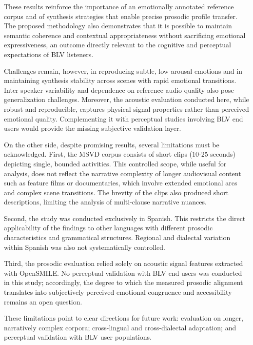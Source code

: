 \documentclass[pdflatex,iicol,sn-mathphys-num]{sn-jnl}%
\theoremstyle{thmstyleone}%
\theoremstyle{thmstyletwo}%
\theoremstyle{thmstylethree}%
\begin{document}
These results reinforce the importance of an emotionally annotated reference corpus and of synthesis strategies that enable precise prosodic profile transfer. The proposed methodology also demonstrates that it is possible to maintain semantic coherence and contextual appropriateness without sacrificing emotional expressiveness, an outcome directly relevant to the cognitive and perceptual expectations of BLV listeners.

Challenges remain, however, in reproducing subtle, low-arousal emotions and in maintaining synthesis stability across scenes with rapid emotional transitions. Inter-speaker variability and dependence on reference-audio quality also pose generalization challenges. Moreover, the acoustic evaluation conducted here, while robust and reproducible, captures physical signal properties rather than perceived emotional quality. Complementing it with perceptual studies involving BLV end users would provide the missing subjective validation layer.

On the other side, despite promising results, several limitations must be acknowledged. First, the MSVD corpus consists of short clips (10-25 seconds) depicting single, bounded activities. This controlled scope, while useful for analysis, does not reflect the narrative complexity of longer audiovisual content such as feature films or documentaries, which involve extended emotional arcs and complex scene transitions. The brevity of the clips also produced short descriptions, limiting the analysis of multi-clause narrative nuances.

Second, the study was conducted exclusively in Spanish. This restricts the direct applicability of the findings to other languages with different prosodic characteristics and grammatical structures. Regional and dialectal variation within Spanish was also not systematically controlled.

Third, the prosodic evaluation relied solely on acoustic signal features extracted with OpenSMILE. No perceptual validation with BLV end users was conducted in this study; accordingly, the degree to which the measured prosodic alignment translates into subjectively perceived emotional congruence and accessibility remains an open question.

These limitations point to clear directions for future work: evaluation on longer, narratively complex corpora; cross-lingual and cross-dialectal adaptation; and perceptual validation with BLV user populations.

\end{document}
